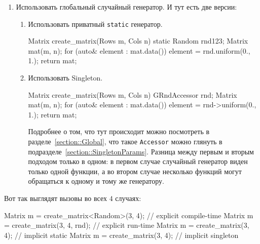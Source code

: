 \begin{enumerate}
\item Использовать глобальный случайный генератор.
И тут есть две версии:
\begin{enumerate}
\item Использовать приватный \verb"static" генератор.
\begin{cppcode}
Matrix create_matrix(Rows m, Cols n) {
  static Random rnd{123};
  Matrix mat(m, n);
  for (auto& element : mat.data())
    element = rnd.uniform(0., 1.);
  return mat;
}
\end{cppcode}

\item Использовать Singleton.
\begin{cppcode}
Matrix create_matrix(Rows m, Cols n) {
  GRndAccessor rnd;
  Matrix mat(m, n);
  for (auto& element : mat.data())
    element = rnd->uniform(0., 1.);
  return mat;
}
\end{cppcode}
Подробнее о том, что тут происходит можно посмотреть в разделе~\ref{section::Global}, что такое \verb"Accessor" можно глянуть в подразделе~\ref{section::SingletonParams}.
Разница между первым и вторым подходом только в одном: в первом случае случайный генератор виден только одной функции, а во втором случае несколько функций могут обращаться к одному и тому же генератору.
\end{enumerate}
\end{enumerate}

Вот так выглядят вызовы во всех $4$ случаях:
\begin{cppcode}
Matrix m = create_matrix<Random>(3, 4); // explicit compile-time
Matrix m = create_matrix(3, 4, rnd);    // explicit run-time
Matrix m = create_matrix(3, 4);         // implicit static
Matrix m = create_matrix(3, 4);         // implicit singleton
\end{cppcode}

